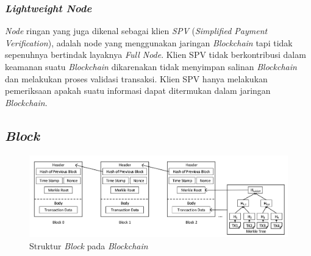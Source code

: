 \subsubsection{\emph{Lightweight Node}}

\emph{Node} ringan yang juga dikenal sebagai klien \emph{SPV} (\emph{Simplified Payment Verification}), adalah node yang menggunakan jaringan \emph{Blockchain} tapi tidak sepenuhnya bertindak layaknya \emph{Full Node}. Klien SPV tidak berkontribusi dalam keamanan suatu \emph{Blockchain} dikarenakan tidak menyimpan salinan \emph{Blockchain} dan melakukan proses validasi transaksi. Klien SPV hanya melakukan pemeriksaan apakah suatu informasi dapat ditermukan dalam jaringan \emph{Blockchain}.

\subsection{\emph{Block}}

\begin{figure} [ht] \centering
  \includegraphics[scale=0.55]{gambar/img-block-structure.png}
  \caption{Struktur \emph{Block} pada \emph{Blockchain}}
  \label{fig:Metaverse}
\end{figure}

